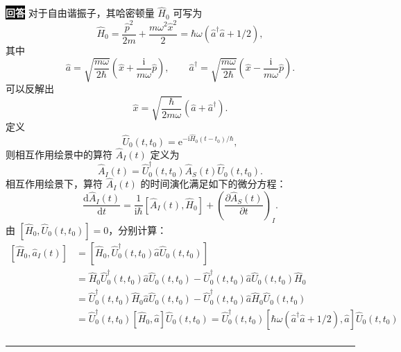 \documentclass[11pt,a4paper]{ctexart}
\newenvironment{answer}
  {\par\smallskip\noindent
   \begingroup
   \setlength{\fboxsep}{4pt}%
   \colorbox{black}{\textcolor{white}{\bfseries 回答}}%
   \endgroup
   \quad\ignorespaces}
  {\par\smallskip\noindent\rule{\linewidth}{0.4pt}\medskip}
\begin{document}
\begin{answer}
  对于自由谐振子，其哈密顿量 $\hat{H}_0 $ 可写为
  \begin{equation}
    \hat{H}_0
    =\frac{\hat p^2}{2m}+\frac{m\omega^2\hat x^2}{2}
    =\hbar\omega\left(\hat{a}^\dag \hat{a} + 1/2 \right),
  \end{equation}
  其中
  \begin{equation}
    \hat a=\sqrt{\frac{m\omega}{2\hbar}}\left(\hat x+\frac{\mathrm{i}}{m\omega}\hat p\right),\qquad
    \hat a^\dagger=\sqrt{\frac{m\omega}{2\hbar}}\left(\hat x-\frac{\mathrm{i}}{m\omega}\hat p\right).
  \end{equation}
  可以反解出
  \begin{equation}
    \hat{x}
    =\sqrt{\frac{\hbar }{2m\omega } }\left(\hat{a}+\hat{a}^\dag \right).
  \end{equation}
  定义
  \begin{equation}
    \hat{U}_0(t,t_0)
    =\mathrm{e}^{-\mathrm{i}\hat{H}_0(t-t_0)/\hbar},
  \end{equation}
  则相互作用绘景中的算符 $\hat{A}_I(t) $ 定义为
  \begin{equation}
    \hat{A}_I(t)
    =\hat{U}_0^\dag(t,t_0) \hat{A}_S(t) \hat{U}_0(t,t_0).
  \end{equation}
  相互作用绘景下，算符 $\hat{A}_I(t) $ 的时间演化满足如下的微分方程：
  \begin{equation}
    \frac{\mathrm{d}\hat{A}_I(t) }{\mathrm{d}t }
    =\frac{1 }{\mathrm{i}\hbar }\left[\hat{A}_I(t),\hat{H}_0 \right] + \left(\frac{\partial \hat{A}_S(t) }{\partial t}  \right)_I.  
  \end{equation}
  由 $\left[\hat{H}_0,\hat{U}_0(t,t_0) \right]=0 $，分别计算：
  \begin{equation}
    \begin{aligned}
      \left[\hat{H}_0,\hat{a}_I(t) \right]
      &=\left[\hat{H}_0,\hat{U}_0^\dag(t,t_0) \hat{a} \hat{U}_0(t,t_0) \right] \\
      &=\hat{H}_0 \hat{U}_0^\dag(t,t_0) \hat{a} \hat{U}_0(t,t_0) - \hat{U}_0^\dag(t,t_0) \hat{a} \hat{U}_0(t,t_0) \hat{H}_0 \\
      &=\hat{U}_0^\dag(t,t_0) \hat{H}_0 \hat{a} \hat{U}_0(t,t_0) - \hat{U}_0^\dag(t,t_0) \hat{a} \hat{H}_0 \hat{U}_0(t,t_0) \\
      &=\hat{U}_0^\dag(t,t_0) \left[\hat{H}_0,\hat{a} \right] \hat{U}_0(t,t_0)
      =\hat{U}_0^\dag(t,t_0) \left[\hbar\omega\left(\hat{a}^\dag\hat{a}+1/2 \right),\hat{a} \right] \hat{U}_0(t,t_0) \\

\end{aligned}
\end{equation}
\end{answer}
\end{document}
